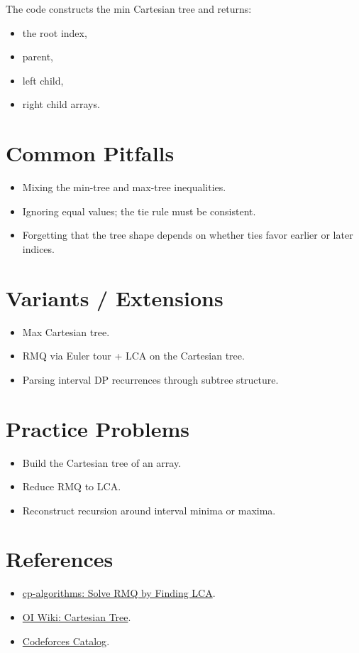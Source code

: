 The code constructs the min Cartesian tree and returns:

\begin{itemize}
  \item the root index,
  \item parent,
  \item left child,
  \item right child arrays.
\end{itemize}

\section*{Common Pitfalls}

\begin{itemize}
  \item Mixing the min-tree and max-tree inequalities.
  \item Ignoring equal values; the tie rule must be consistent.
  \item Forgetting that the tree shape depends on whether ties favor earlier or later indices.
\end{itemize}

\section*{Variants / Extensions}

\begin{itemize}
  \item Max Cartesian tree.
  \item RMQ via Euler tour + LCA on the Cartesian tree.
  \item Parsing interval DP recurrences through subtree structure.
\end{itemize}

\section*{Practice Problems}

\begin{itemize}
  \item Build the Cartesian tree of an array.
  \item Reduce RMQ to LCA.
  \item Reconstruct recursion around interval minima or maxima.
\end{itemize}

\section*{References}

\begin{itemize}
  \item \href{https://cp-algorithms.com/graph/rmq_linear.html}{cp-algorithms: Solve RMQ by Finding LCA}.
  \item \href{https://en.oi-wiki.org/ds/cartesian-tree/}{OI Wiki: Cartesian Tree}.
  \item \href{https://codeforces.com/catalog}{Codeforces Catalog}.
\end{itemize}
